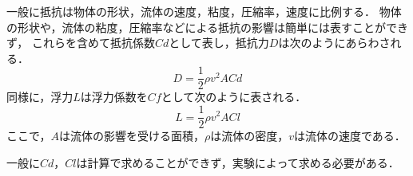一般に抵抗は物体の形状，流体の速度，粘度，圧縮率，速度に比例する．
物体の形状や，流体の粘度，圧縮率などによる抵抗の影響は簡単には表すことができず，
これらを含めて抵抗係数$Cd$として表し，抵抗力$D$は次のようにあらわされる．
\begin{equation}
    D = \frac{1}{2} \rho v^2 A Cd
\end{equation}
同様に，浮力$L$は浮力係数を$Cf$として次のように表される．
\begin{equation}
    L = \frac{1}{2} \rho v^2 A Cl
\end{equation}
ここで，$A$は流体の影響を受ける面積，$\rho$は流体の密度，$v$は流体の速度である．

一般に$Cd$，$Cl$は計算で求めることができず，実験によって求める必要がある．